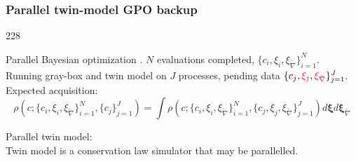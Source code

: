 \documentclass{beamer}
\let\oldcite=\cite
\renewcommand{\cite}[1]{\textcolor[rgb]{.4,.4,.85}{\oldcite{#1}}}
\newcommand{\barrow}{\item[\color{darkred}\ding{228}]}
\begin{document}
\begin{frame}
    \frametitle{Parallel twin-model GPO \hfill \scriptsize{backup}}\small
    \begin{dinglist}{228}
        \barrow Parallel Bayesian optimization \scriptsize \cite{Snoek 12} \small.
        $N$ evaluations completed, $\{c_i,\xi_i,\xi_{\tilde{\nabla}}\}_{i=1}^N$.\\
        Running gray-box and twin model on $J$ processes, pending data $\{c_j, \textcolor{red}{\xi_j}, 
        \textcolor{red}{\xi_{\tilde{\nabla}}} \}_{j=1}^J$.\\
        Expected acquisition:
        $$
            \rho(c; \{c_i,\xi_i,\xi_{\tilde{\nabla}}\}_{i=1}^N, \{c_j\}_{j=1}^J) = 
            \int \rho(c; \{c_i,\xi_i,\xi_{\tilde{\nabla}}\}_{i=1}^N, \{c_j,  \xi_j, \xi_{\tilde{\nabla}}\}_{j=1}^J) 
            d\boldsymbol{\xi} d\boldsymbol{\xi}_{\tilde{\nabla}}
        $$
        \barrow Parallel twin model:\\
        Twin model is a conservation law simulator that may be parallelled.
    \end{dinglist}
\end{frame}
\end{document}
